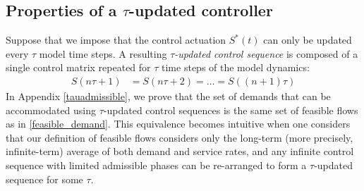 \subsection*{Properties of a $\tau$-updated controller}
Suppose that we impose that the control actuation $S^*(t)$ can only be updated every $\tau$ model time steps. A resulting \emph{$\tau$-updated control sequence} is composed of a single  control matrix repeated for $\tau$ time steps of the model dynamics:
\begin{align}  \label{CYCLE_CONTROLLER}
S(n\tau+1)  &= S(n\tau +2) = \ldots = S((n+1)\tau ) %
\end{align}
%
%
%
In Appendix \ref{tauadmissible}, we prove that the set of demands that can be accommodated using $\tau$-updated control sequences is the same set of feasible flows as in \eqref{feasible_demand}. This equivalence becomes intuitive when one considers that our definition of feasible flows considers only the long-term (more precisely, infinite-term) average of both demand and service rates, and any infinite control sequence with limited admissible phases can be re-arranged to form a $\tau$-updated sequence for some $\tau$. 
